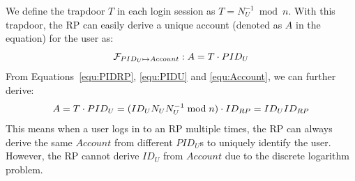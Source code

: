  We define the trapdoor $T$ in each login session as $T = N_U^{-1} \bmod n$.
With this trapdoor, the RP can easily derive a unique account (denoted as $A$ in the equation) for the user as:%
\begin{equation}
\setlength{\abovedisplayskip}{3pt}
\setlength{\belowdisplayskip}{3pt}
   \mathcal{F}_{PID_{U} \mapsto Account}: A = {T} \cdot {PID_U}
   \label{equ:Account}
\end{equation}
From Equations~\ref{equ:PIDRP}, \ref{equ:PIDU} and \ref{equ:Account}, we can further derive:
\begin{equation*}
\setlength{\abovedisplayskip}{3pt}
\setlength{\belowdisplayskip}{3pt}
   A =  {T} \cdot {PID_{U}}
   = {(ID_U N_U N_U^{-1} \bmod n)} \cdot {ID_{RP}}
   = {ID_U}{ID_{RP}}
   \label{equ:AccountNotChanged}
\end{equation*}
This means when a user logs in to an RP multiple times, the RP can always derive the same $Account$ from different $PID_U$s to uniquely identify the user. However, the RP cannot derive $ID_U$ from $Account$ due to the discrete logarithm problem.

